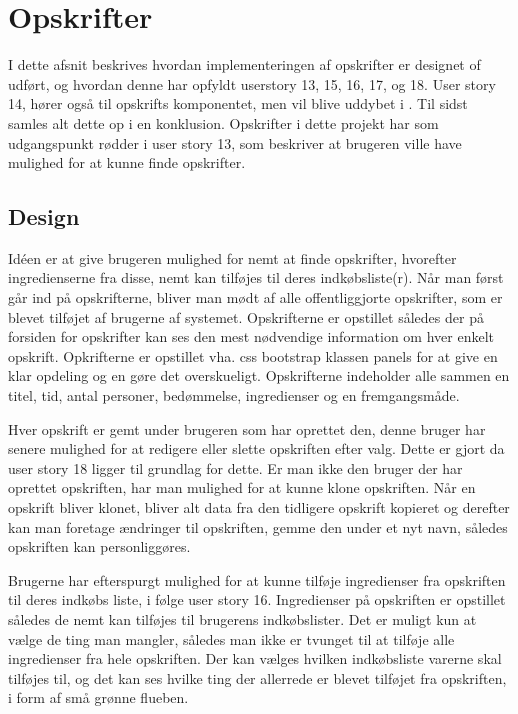 \section{Opskrifter}
I dette afsnit beskrives hvordan implementeringen af opskrifter er designet of udført, og hvordan denne har opfyldt userstory 13, 15, 16, 17, og 18. User story 14, hører også til opskrifts komponentet, men vil blive uddybet i . Til sidst samles alt dette op i en konklusion. Opskrifter i dette projekt har som udgangspunkt rødder i user story 13, som beskriver at brugeren ville have mulighed for at kunne finde opskrifter.
\subsection{Design}
Idéen er at give brugeren mulighed for nemt at finde opskrifter, hvorefter ingredienserne fra disse, nemt kan tilføjes til deres indkøbsliste(r).
Når man først går ind på opskrifterne, bliver man mødt af alle offentliggjorte opskrifter, som er blevet tilføjet af brugerne af systemet.
Opskrifterne er opstillet således der på forsiden for opskrifter kan ses den mest nødvendige information om hver enkelt opskrift.
Opkrifterne er opstillet vha. css bootstrap klassen panels for at give en klar opdeling og en gøre det overskueligt.
Opskrifterne indeholder alle sammen en titel, tid, antal personer, bedømmelse, ingredienser og en fremgangsmåde.

Hver opskrift er gemt under brugeren som har oprettet den, denne bruger har senere mulighed for at redigere eller slette opskriften efter valg.
Dette er gjort da user story 18 ligger til grundlag for dette.
Er man ikke den bruger der har oprettet opskriften, har man mulighed for at kunne klone opskriften.
Når en opskrift bliver klonet, bliver alt data fra den tidligere opskrift kopieret og derefter kan man foretage ændringer til opskriften, gemme den under et nyt navn, således opskriften kan personliggøres.

Brugerne har efterspurgt mulighed for at kunne tilføje ingredienser fra opskriften til deres indkøbs liste, i følge user story 16.
Ingredienser på opskriften er opstillet således de nemt kan tilføjes til brugerens indkøbslister.
Det er muligt kun at vælge de ting man mangler, således man ikke er tvunget til at tilføje alle ingredienser fra hele opskriften.
Der kan vælges hvilken indkøbsliste varerne skal tilføjes til, og det kan ses hvilke ting der allerrede er blevet tilføjet fra opskriften, i form af små grønne flueben.


